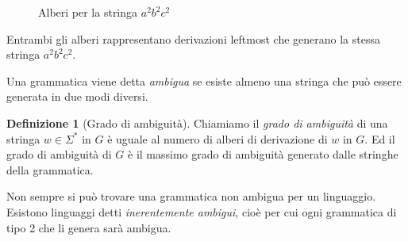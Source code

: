 \documentclass[12pt]{report}
\theoremstyle{definition}
\newtheorem{definizione}{Definizione}
\begin{document}
\begin{figure}[H]
	\centering
	\begin{subfigure}{.45\textwidth}
	\end{subfigure}
	\begin{subfigure}{.45\textwidth}
	\end{subfigure}
	\caption{Alberi per la stringa $a^2 b^2 c^2$}
\end{figure}
Entrambi gli alberi rappresentano derivazioni leftmost che generano la stessa stringa $a^2 b^2 c^2$. %

Una grammatica viene detta \textit{ambigua} se esiste almeno una stringa che può essere generata in due modi diversi.
\begin{definizione}[Grado di ambiguità]
	Chiamiamo il \textit{grado di ambiguità} di una stringa $w \in \Sigma^*$ in $G$ è uguale al numero di alberi di derivazione di $w$ in $G$.
	Ed il grado di ambiguità di $G$ è il massimo grado di ambiguità generato dalle stringhe della grammatica.
\end{definizione}

Non sempre si può trovare una grammatica non ambigua per un linguaggio.
Esistono linguaggi detti \textit{inerentemente ambigui}, cioè per cui ogni grammatica di tipo 2 che li genera sarà ambigua.
\end{document}
